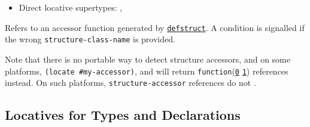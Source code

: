 \begin{itemize}
  \begin{itemize}
  \tightlist
  \item
    Direct locative supertypes:
    ,
  \end{itemize}

  Refers to an accessor function generated by
  \href{http://www.lispworks.com/documentation/HyperSpec/Body/m_defstr.htm}{\texttt{defstruct}}.
  A
  condition is signalled if the wrong \texttt{structure-class-name} is
  provided.

  Note that there is no portable way to detect structure accessors, and
  on some platforms, \texttt{(locate\ \#\textquotesingle{}my-accessor)},
  and
  will return
  \texttt{function}(\href{http://www.lispworks.com/documentation/HyperSpec/Body/t_fn.htm}{\texttt{0}}
  \href{http://www.lispworks.com/documentation/HyperSpec/Body/s_fn.htm}{\texttt{1}})
  references instead. On such platforms, \texttt{structure-accessor}
  references do not
  .
\end{itemize}

\subsection{Locatives for Types and
Declarations}\label{locatives-for-types-and-declarations}

\label{x-28DREF-3A-40TYPELIKE-LOCATIVES-20MGL-PAX-3ASECTION-29}

